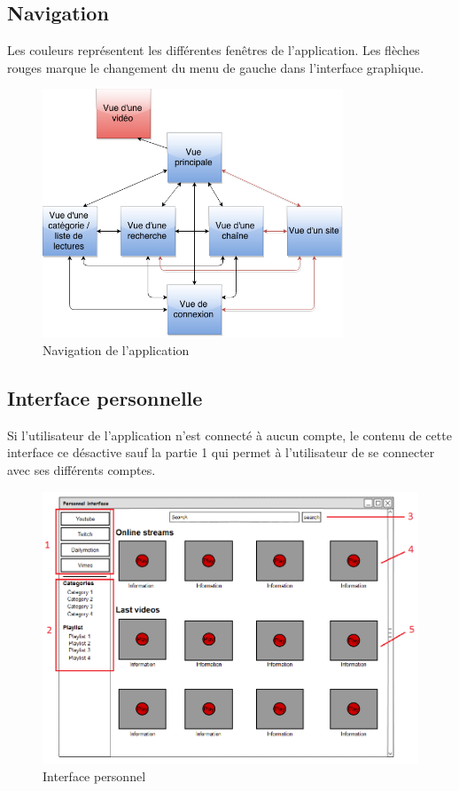 \documentclass[11pt]{report} %
\begin{document}
		\subsection{Navigation}
		Les couleurs représentent les différentes fenêtres de l'application. Les flèches rouges marque le changement du menu de gauche dans l'interface graphique.
		
		\begin{figure}[h]
			\center
			\includegraphics[width=0.8\textwidth]{../img/navigation.png}
			\caption{Navigation de l'application}
			\label{navigation}
		\end{figure}
		
		\subsection{Interface personnelle}
		Si l'utilisateur de l'application n'est connecté à aucun compte, le contenu de cette interface ce désactive sauf la partie 1 qui permet à l'utilisateur de se connecter avec ses différents comptes.
		\begin{figure}[h]
			\center
			\includegraphics[width=1\textwidth]{../img/personnalInterfacenum.png}
			\caption{Interface personnel}
			\label{interfacepersonnel}
		\end{figure}
		
\end{document}
